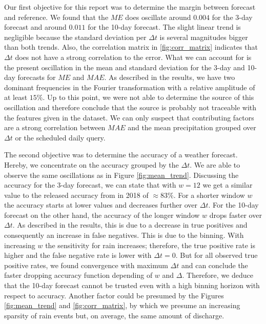 \documentclass{article}
\theoremstyle{plain}
\theoremstyle{definition}
\theoremstyle{remark}
\begin{document}
Our first objective for this report was to determine the margin between
forecast and reference. We found that the $ME$ does oscillate around $0.004$
for the 3-day forecast and around $0.011$ for the 10-day forecast.
The slight linear trend is negligible because the standard deviation per
$\Delta t$ is several magnitudes bigger than both trends. Also, the correlation
matrix in \ref{fig:corr_matrix} indicates that $\Delta t$ does not have a
strong correlation to the error.
What we can account for is the present oscillation in the mean and standard
deviation for the 3-day and 10-day forecasts for $ME$ and $MAE$. As described
in the results, we have two dominant frequencies in the Fourier transformation
with a relative amplitude of at least $15 \%$. Up to this point, we were not
able to determine the source of this oscillation and therefore conclude that
the source is probably not traceable with the features given in the dataset. We
can only suspect that contributing factors are a strong correlation between
$MAE$ and the mean precipitation grouped over $\Delta t$ or the scheduled daily
query.

The second objective was to determine the accuracy of a weather forecast.
Hereby, we concentrate on the accuracy grouped by the $\Delta t$. We are able
to observe the same oscillations as in Figure \ref{fig:mean_trend}. Discussing
the accuracy for the 3-day forecast, we can state that with $w = 12$ we get a
similar value to the released accuracy from \cite{Forecast_quaility_DWD} in
2018 of $\approx 83 \%$. For a shorter window $w$ the accuracy starts at lower
values and decreases further over $\Delta t$. For the 10-day forecast on the
other hand, the accuracy of the longer window $w$ drops faster over $\Delta t$.
As described in the results, this is due to a decrease in true positives and
consequently an increase in false negatives. This is due to the binning. With
increasing $w$ the sensitivity for rain increases; therefore, the true positive
rate is higher and the false negative rate is lower with $\Delta t = 0$. But
for all observed true positive rates, we found convergence with maximum $\Delta
    t$ and can conclude the faster dropping accuracy function depending of $w$ and
$\Delta$. Therefore, we deduce that the 10-day forecast cannot be trusted even
with a high binning horizon with respect to accuracy.
Another factor could be presumed by the Figures \ref{fig:mean_trend} and
\ref{fig:corr_matrix}, by which we presume an increasing sparsity of rain
events but, on average, the same amount of discharge.
\end{document}
